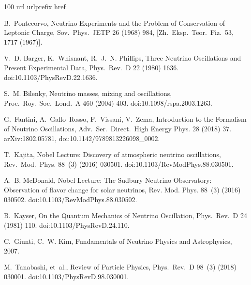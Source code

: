 \documentclass[final,5p,times,twocolumn]{elsarticle}
\begin{document}
\begin{thebibliography}{100}
\expandafter\ifx\csname url\endcsname\relax
  \def\url#1{\texttt{#1}}\fi
\expandafter\ifx\csname urlprefix\endcsname\relax\def\urlprefix{URL }\fi
\expandafter\ifx\csname href\endcsname\relax
  \def\href#1#2{#2} \def\path#1{#1}\fi

B.~Pontecorvo, {Neutrino Experiments and the Problem of Conservation of
  Leptonic Charge}, Sov.\ Phys.\ JETP 26 (1968) 984, [Zh.\ Eksp.\ Teor.\ Fiz.\
  53, 1717 (1967)].

V.~D. Barger, K.~Whisnant, R.~J.~N. Phillips, {Three Neutrino Oscillations and
  Present Experimental Data}, Phys.\ Rev.\ D 22 (1980) 1636.
\newblock \href {http://dx.doi.org/10.1103/PhysRevD.22.1636}
  {\path{doi:10.1103/PhysRevD.22.1636}}.

S.~M. Bilenky, {Neutrino masses, mixing and oscillations}, Proc.\ Roy.\ Soc.\
  Lond.\ A 460 (2004) 403.
\newblock \href {http://dx.doi.org/10.1098/rspa.2003.1263}
  {\path{doi:10.1098/rspa.2003.1263}}.

G.~Fantini, A.~Gallo~Rosso, F.~Vissani, V.~Zema, {Introduction to the Formalism
  of Neutrino Oscillations}, Adv.\ Ser.\ Direct.\ High Energy Phys. 28 (2018)
  37.
\newblock \href {http://arxiv.org/abs/1802.05781} {\path{arXiv:1802.05781}},
  \href {http://dx.doi.org/10.1142/9789813226098_0002}
  {\path{doi:10.1142/9789813226098_0002}}.

T.~Kajita, {Nobel Lecture: Discovery of atmospheric neutrino oscillations},
  Rev.\ Mod.\ Phys. 88~(3) (2016) 030501.
\newblock \href {http://dx.doi.org/10.1103/RevModPhys.88.030501}
  {\path{doi:10.1103/RevModPhys.88.030501}}.

A.~B. McDonald, {Nobel Lecture: The Sudbury Neutrino Observatory: Observation
  of flavor change for solar neutrinos}, Rev. Mod. Phys. 88~(3) (2016) 030502.
\newblock \href {http://dx.doi.org/10.1103/RevModPhys.88.030502}
  {\path{doi:10.1103/RevModPhys.88.030502}}.

B.~Kayser, {On the Quantum Mechanics of Neutrino Oscillation}, Phys.\ Rev.\ D
  24 (1981) 110.
\newblock \href {http://dx.doi.org/10.1103/PhysRevD.24.110}
  {\path{doi:10.1103/PhysRevD.24.110}}.

C.~Giunti, C.~W. Kim, {Fundamentals of Neutrino Physics and Astrophysics},
  2007.

M.~Tanabashi, et~al., {Review of Particle Physics}, Phys.\ Rev.\ D 98~(3)
  (2018) 030001.
\newblock \href {http://dx.doi.org/10.1103/PhysRevD.98.030001}
  {\path{doi:10.1103/PhysRevD.98.030001}}.


\end{thebibliography}
\end{document}
